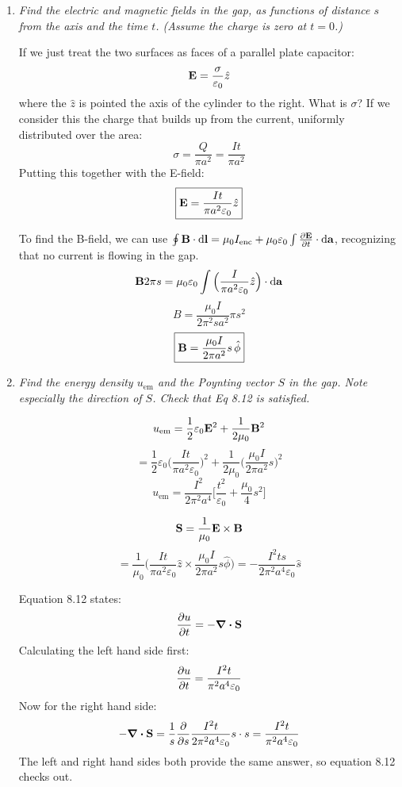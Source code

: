 \documentclass[12pt]{article}
\begin{document}
\begin{enumerate}[label=\alph*)]
\item \emph{Find the electric and magnetic fields in the gap, as functions of distance $s$ from the axis and the time $t$. (Assume the charge is zero at $t=0$.)}\bigskip

If we just treat the two surfaces as faces of a parallel plate capacitor:
\[\vb{E}=\frac{\sigma}{\varepsilon_0}\hat{z}\]
where the $\hat{z}$ is pointed the axis of the cylinder to the right. What is $\sigma$? If we consider this the charge that builds up from the current, uniformly distributed over the area:
\[\sigma = \frac{Q}{\pi a^2} = \frac{It}{\pi a^2}\]
Putting this together with the E-field:
\[\boxed{\vb{E} = \frac{It}{\pi a^2 \varepsilon_0}\hat{z}}\]

To find the B-field, we can use $\oint \vb{B} \cdot \dd{\vb{l}} = \mu_0 I_\text{enc} + \mu_0 \varepsilon_0 \int \pdv{\vb{E}}{t}\cdot \dd{\vb{a}}$, recognizing that no current is flowing in the gap.
\[\vb{B}2\pi s = \mu_0 \varepsilon_0 \int \Big(\frac{I}{\pi a^2 \varepsilon_0}\hat{z}\Big)\cdot \dd{\vb{a}}\]
\[B = \frac{\mu_0 I}{2 \pi^2 s a^2} \pi s^2\]
\[\boxed{\vb{B} = \frac{\mu_0 I}{2 \pi a^2} s \, \hat{\phi}}\]

\item \emph{Find the energy density $u_\text{em}$ and the Poynting vector $S$ in the gap. Note especially the direction of $S$. Check that Eq 8.12 is satisfied.}\bigskip

\[u_\text{em} = \frac{1}{2} \varepsilon_0 \vb{E}^2 + \frac{1}{2\mu_0} \vb{B}^2\]
\[= \frac{1}{2} \varepsilon_0 \Big( \frac{It}{\pi a^2 \varepsilon_0} \Big)^2 + \frac{1}{2 \mu_0}\Big( \frac{\mu_0 I}{2 \pi a^2}s\Big)^2\]
\[\boxed{u_\text{em} = \frac{I^2}{2\pi^2 a^4}\Big[ \frac{t^2}{\varepsilon_0} + \frac{\mu_0}{4}s^2\Big]}\]

\[\vb{S} = \frac{1}{\mu_0}\vb{E}\times \vb{B} \]
\[= \frac{1}{\mu_0}\Big(\frac{It}{\pi a^2 \varepsilon_0} \hat{z} \times \frac{\mu_0 I}{2 \pi a^2}s \hat{\phi} \Big) = \boxed{ -\frac{I^2 t s}{2 \pi^2 a^4 \varepsilon_0}\hat{s}}\]

Equation 8.12 states:
\[\pdv{u}{t} = -\div{\vb{S}}\]
Calculating the left hand side first:
\[\pdv{u}{t} = \frac{I^2 t}{\pi^2 a^4 \varepsilon_0}\]
Now for the right hand side:
\[-\div{\vb{S}} = \frac{1}{s}\pdv{s}\frac{I^2 t}{2\pi^2 a^4 \varepsilon_0}s \cdot s = \frac{I^2 t}{\pi^2 a^4 \varepsilon_0}\]
The left and right hand sides both provide the same answer, so equation 8.12 checks out. 


\end{enumerate}
\end{document}
